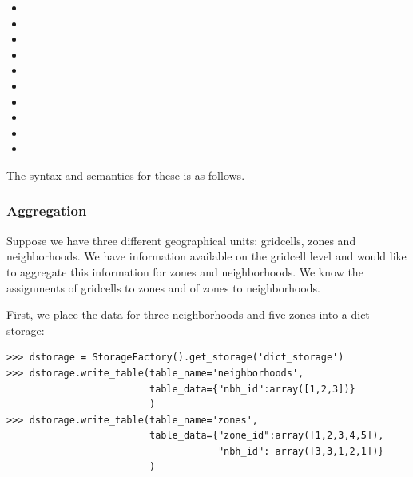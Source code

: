 \begin{itemize}
\item {}

\item {}

\item {}

\item {}

\item {}

\item {}

\item {}

\item {}

\item {}

\item {}

\end{itemize}

The syntax and semantics for these is as follows.

\subsubsection{Aggregation}

Suppose we have three different geographical units: gridcells, zones and
neighborhoods.  We have information available on the gridcell level and
would like to aggregate this information for zones and neighborhoods. We
know the assignments of gridcells to zones and of zones to neighborhoods.

First, we place the data for three neighborhoods and five zones into a dict storage:
\begin{verbatim}
>>> dstorage = StorageFactory().get_storage('dict_storage')
>>> dstorage.write_table(table_name='neighborhoods',
                         table_data={"nbh_id":array([1,2,3])}
                         )
>>> dstorage.write_table(table_name='zones',
                         table_data={"zone_id":array([1,2,3,4,5]),
                                     "nbh_id": array([3,3,1,2,1])}
                         )
\end{verbatim}

